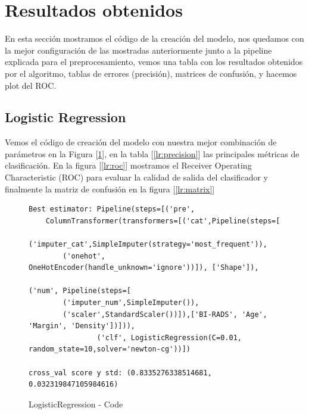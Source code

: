 \documentclass[12pt,twoside]{report}
\begin{document}
\chapter*{Resultados obtenidos}

En esta sección mostramos el código de la creación del modelo, nos quedamos con la mejor configuración de las mostradas anteriormente junto a la pipeline explicada para el preprocesamiento, vemos una tabla con los resultados obtenidos por el algoritmo, tablas de errores (precisión), matrices de confusión, y hacemos plot del ROC. 

\section*{Logistic Regression}

Vemos el código de creación del modelo con nuestra mejor combinación de parámetros en la Figura [\ref{lr:code}], en la tabla [\ref{lr:precision}] las principales métricas de clasificación. En la figura [\ref{lr:roc}] mostramos el Receiver Operating Characteristic (ROC) para evaluar la calidad de salida del clasificador y finalmente la matriz de confusión en la figura [\ref{lr:matrix}]

\begin{figure}[ht]
 \begin{lstlisting}
Best estimator: Pipeline(steps=[('pre',
	ColumnTransformer(transformers=[('cat',Pipeline(steps=[
		('imputer_cat',SimpleImputer(strategy='most_frequent')),
		('onehot', OneHotEncoder(handle_unknown='ignore'))]), ['Shape']),
														('num', Pipeline(steps=[
		('imputer_num',SimpleImputer()),
		('scaler',StandardScaler())]),['BI-RADS', 'Age', 'Margin', 'Density'])])),
                ('clf', LogisticRegression(C=0.01, random_state=10,solver='newton-cg'))])
                
cross_val score y std: (0.8335276338514681, 0.032319847105984616)
 \end{lstlisting}
 \caption{LogisticRegression - Code}
 \label{lr:code}
 \end{figure}
\end{document}
